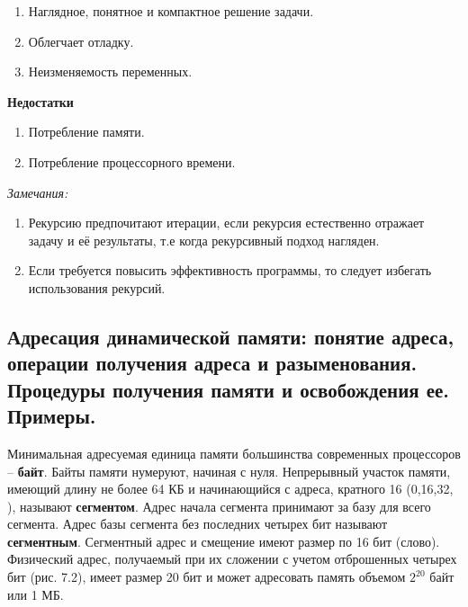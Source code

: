 \begin{enumerate}
\item Наглядное, понятное и компактное решение задачи.
\item Облегчает отладку.
\item Неизменяемость переменных.
\end{enumerate}

\noindent
{\bf Недостатки}

\begin{enumerate}
\item Потребление памяти. 
\item Потребление процессорного времени.
\end{enumerate}

\noindent
{\textit {Замечания:}}
\begin{enumerate}
\item Рекурсию предпочитают итерации, если рекурсия естественно отражает задачу и её результаты, т.е когда рекурсивный подход нагляден.
\item Если требуется повысить эффективность программы, то следует избегать использования рекурсий.
\end{enumerate}

\vspace*{50pt}







\newpage\subsection{Адресация динамической памяти: понятие адреса, операции получения адреса и разыменования. Процедуры получения памяти и освобождения ее. Примеры. }

\begin{myquote}
            
\end{myquote}

Минимальная адресуемая единица памяти большинства современных процессоров – {\bf байт}. Байты памяти нумеруют, начиная с нуля. Непрерывный участок памяти, имеющий длину не более 64 КБ и начинающийся с адреса, кратного 16 (0,16,32, ), называют {\bf сегментом}. Адрес начала сегмента принимают за базу для всего сегмента. Адрес базы сегмента без последних четырех бит называют {\bf сегментным}. Сегментный адрес и смещение имеют размер по 16 бит (слово). Физический адрес, получаемый при их сложении с учетом отброшенных четырех бит (рис. 7.2), имеет размер 20 бит и может адресовать память объемом $2^{20}$ байт или 1 МБ.

